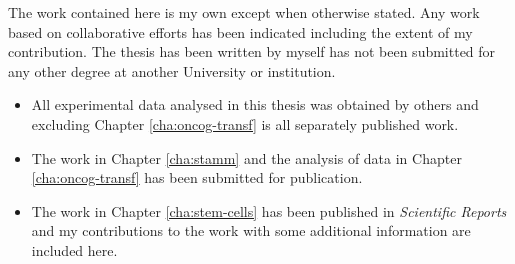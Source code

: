 \documentclass[11pt,a4paper]{report}      %
\begin{document}

\thesiscopyrightpage                 %

 \thesistitlepage                     %


\tableofcontents                     %

\begin{thesisacknowledgments}        %


\end{thesisacknowledgments}

\begin{thesisdeclaration}        %

  The work contained here is my own except when otherwise stated. Any work based on collaborative efforts has been indicated including the extent of my contribution. The thesis has been written by myself has not been submitted for any other degree at another University or institution.

  \begin{itemize}
  \item All experimental data analysed in this thesis was obtained by others and excluding Chapter \ref{cha:oncog-transf} is all separately published work.
  \item The work in Chapter \ref{cha:stamm} and the analysis of data in Chapter \ref{cha:oncog-transf} has been submitted for publication.
  \item The work in Chapter \ref{cha:stem-cells} has been published in \emph{Scientific Reports} and my contributions to the work with some additional information are included here. 
  \end{itemize}

\end{thesisdeclaration}
\end{document}
